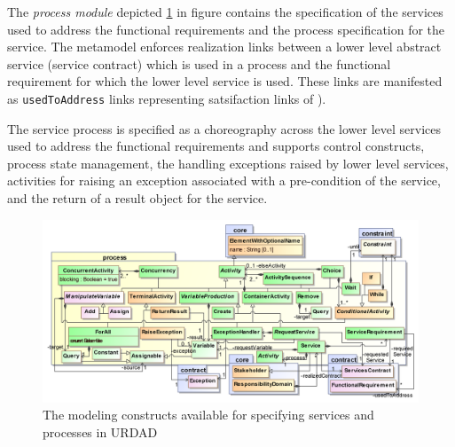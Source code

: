 The \emph{process module} depicted \ref{fig:processModule} in figure contains the specification of the services used to address the functional requirements and the process specification for the service. The metamodel enforces realization links between a lower level abstract service (service contract) which is used in a process and the functional requirement for which the lower level service is used. These links are manifested as \verb+usedToAddress+ links representing satsifaction links of \cite{ramesh_toward_2001}). 

The service process is specified as a choreography across the lower level services used to address the functional requirements and supports control constructs, process state management, the handling exceptions raised by lower level services, activities for raising an exception associated with a pre-condition of the service, and the return of a result object for the service. 

\begin{figure}[Htbp]
  \centering
  \includegraphics{process}
  \caption{The modeling constructs available for specifying services and processes in URDAD}
  \label{fig:processModule}
\end{figure}

